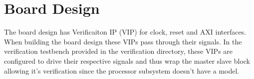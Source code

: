 \documentclass{report}
\begin{document}
\chapter{Board Design}
The board design has Verificaiton IP (VIP) for clock, reset and AXI interfaces.  When building
the board design these VIPs pass through their signals.  In the verification testbench provided
in the verification directory, these VIPs are configured to drive their respective signals and
thus wrap the master slave block allowing it's verification since the processor subsystem
doesn't have a model.
\begin{figure}[h]
	\begin{center}
\end{center}
\end{figure}
\end{document}
